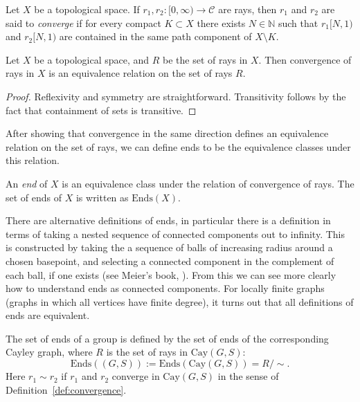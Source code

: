\begin{definition} 
\label{def:convergence}
    Let \(X\) be a topological space. If \(r_1, r_2 : [0,\infty) \to \mathcal{C}\) are rays, then \(r_1\) and \(r_2\) are said to \emph{converge} if for every compact \(K \subset X\) there exists \(N \in \mathbb{N}\) such that \(r_1[N,1)\) and \(r_2[N,1)\) are contained in the same path component of \(X \setminus K\).
\end{definition}

\begin{proposition}
    Let \(X\) be a topological space, and \(R\) be the set of rays in \(X\). Then convergence of rays in \(X\) is an equivalence relation on the set of rays \(R\).
\end{proposition}

\begin{proof}
    Reflexivity and symmetry are straightforward. Transitivity follows by the fact that containment of sets is transitive.
\end{proof}

After showing that convergence in the same direction defines an equivalence relation on the set of rays, we can define ends to be the equivalence classes under this relation.
\begin{definition}
\label{def:endsofgraph}
    An \emph{end} of \(X\) is an equivalence class under the relation of convergence of rays. The set of ends of \(X\) is written as \(\mathrm{Ends}(X)\).
\end{definition}

\begin{remark}
\label{rem:diffdefsofends}
    There are alternative definitions of ends, in particular there is a definition in terms of taking a nested sequence of connected components out to infinity. This is constructed by taking the a sequence of balls of increasing radius around a chosen basepoint, and selecting a connected component in the complement of each ball, if one exists (see Meier's book, \cite[p.~208]{M08}). From this we can see more clearly how to understand ends as connected components. For locally finite graphs (graphs in which all vertices have finite degree), it turns out that all definitions of ends are equivalent.
\end{remark}

\begin{definition}
     The set of ends of a group is defined by the set of ends of the corresponding Cayley graph, where \(R\) is the set of rays in \(\mathrm{Cay}(G,S)\):
    \[
        \mathrm{Ends}((G,S)) := \mathrm{Ends}(\mathrm{Cay}(G,S)) = R/\sim.
    \]
    Here \(r_1 \sim r_2\) if \(r_1\) and \(r_2\) converge in \(\mathrm{Cay}(G,S)\) in the sense of Definition~\ref{def:convergence}.
\end{definition}

